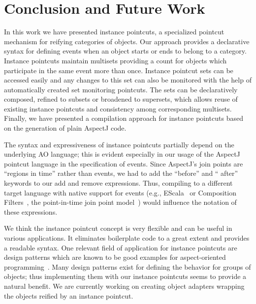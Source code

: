 \documentclass{acm_proc_article-sp}
\begin{document}
\section{Conclusion and Future Work}
In this work we have presented instance pointcuts, a specialized pointcut mechanism for reifying categories of objects. Our approach provides a declarative syntax for defining events when an object starts or ends to belong to a category. Instance pointcuts maintain multisets providing a count for objects which participate in the same event more than once. Instance pointcut sets can be accessed easily and any changes to this set can also be monitored with the help of automatically created set monitoring pointcuts. The sets can be declaratively composed, refined to subsets or broadened to supersets, which allows reuse of existing instance pointcuts and consistency among corresponding multisets. Finally, we have presented a compilation approach for instance pointcuts based on the generation of plain AspectJ code.

The syntax and expressiveness of instance pointcuts partially depend on the underlying AO language; this is evident especially in our usage of the AspectJ pointcut language in the specification of events. Since AspectJ's join points are ``regions in time'' rather than events, we had to add the ``before'' and `` after'' keywords to our add and remove expressions. Thus, compiling to a different target language with native support for events (e.g., EScala~\cite{Gasiunas2011} or Composition
Filters~\cite{Bergmans2001b}, the point-in-time join point model~\cite{masuharafine}) would influence the notation of these expressions.

We think the instance pointcut concept is very flexible and can be useful in various applications. It eliminates boilerplate code to a great extent and provides a readable syntax. One relevant field of application for instance pointcuts are design patterns which are known to be good examples for aspect-oriented programming~\cite{hannemann:oopsla02}. Many design patterns exist for defining the behavior for groups of objects; thus implementing them with our instance pointcuts seems to provide a natural benefit. We are currently working on creating object adapters wrapping the objects reified by an instance pointcut.




\end{document}

